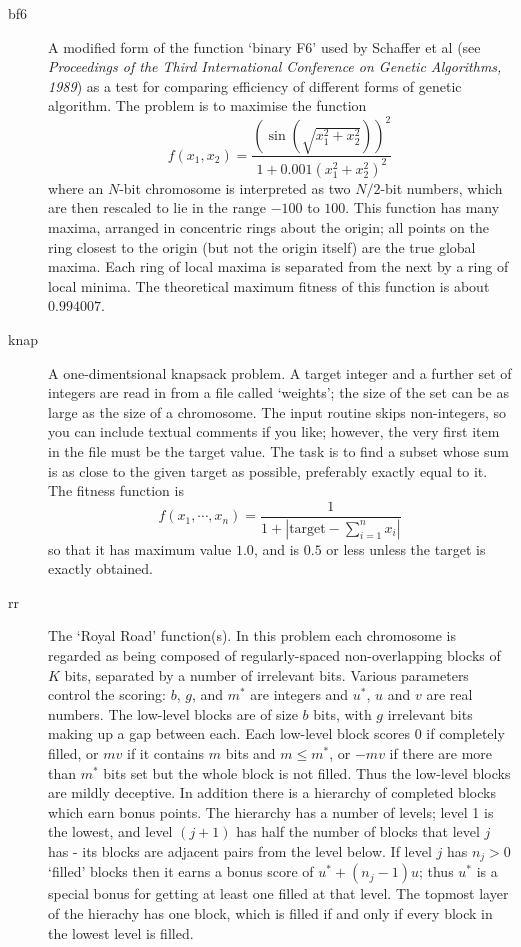 \begin{description}
\item[bf6] A modified form of the function `binary F6' used by Schaffer
  et al (see {\em Proceedings of the Third International Conference on
  Genetic Algorithms, 1989}) as a test for comparing efficiency of
  different forms of genetic algorithm. The problem is to maximise the
  function
\[
f(x_{1},x_{2}) = \frac{(\sin(\sqrt{x_{1}^{2} + x_{2}^{2}}))^{2}}{
   1 + 0.001(x_{1}^{2} + x_{2}^{2})^{2}}
\]
  where an $N$-bit chromosome is interpreted as two $N/2$-bit numbers,
  which are then rescaled to lie in the range $-100$ to $100$.
  This function has many maxima, arranged in concentric rings
  about the origin; all points on the ring closest to the origin 
  (but not the origin itself) are the true global maxima. Each ring of
  local maxima is separated from the next by a ring of local minima.
  The theoretical maximum fitness of this function is about $0.994007$.

\item[knap] A one-dimentsional knapsack problem. A target integer and
  a further set of integers are read in from a file called `weights';
  the size of the set can be as large as the size of a chromosome. The
  input routine skips non-integers, so you can include textual
  comments if you like; however, the very first item in the file must
  be the target value. The task is to find a subset whose sum is as
  close to the given target as possible, preferably exactly equal to
  it. The fitness function is
\[
f(x_{1},\cdots,x_{n}) = \frac{1}{1 + 
     \left| \mbox{target} - \sum_{i=1}^n x_i \right|}
\] 
  so that it has maximum value $1.0$, and is $0.5$ or less unless
  the target is exactly obtained.

\item[rr] The `Royal Road' function(s). In this problem each
  chromosome is regarded as being composed of regularly-spaced
  non-overlapping blocks of $K$ bits, separated by a number of
  irrelevant bits. Various parameters control the scoring: $b$, $g$,
  and $m^*$ are integers and $u^*$, $u$ and $v$ are real numbers. The
  low-level blocks are of size $b$ bits, with $g$ irrelevant bits
  making up a gap between each. Each low-level block scores 0 if
  completely filled, or $mv$ if it contains $m$ bits and $m \leq m^*$,
  or $-mv$ if there are more than $m^*$ bits set but the whole block
  is not filled. Thus the low-level blocks are mildly deceptive. In
  addition there is a hierarchy of completed blocks which earn bonus
  points. The hierarchy has a number of levels; level 1 is the lowest,
  and level $(j+1)$ has half the number of blocks that level $j$ has -
  its blocks are adjacent pairs from the level below. If level $j$ has
  $n_j > 0$ `filled' blocks then it earns a bonus score of $u^* +
  (n_j-1)u$; thus $u^*$ is a special bonus for getting at least one
  filled at that level. The topmost layer of the hierachy has one
  block, which is filled if and only if every block in the lowest
  level is filled.


\end{description}
